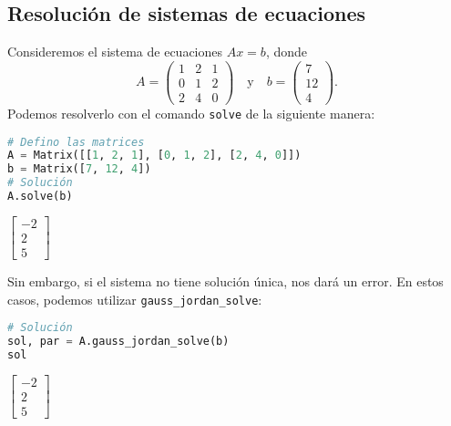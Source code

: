 \documentclass[a4,11pt]{aleph-notas}
\begin{document}
\subsection{Resolución de sistemas de ecuaciones}

Consideremos el sistema de ecuaciones \(Ax=b\), donde 
\[
    A = \begin{pmatrix}1 & 2 & 1\\0 & 1 & 2\\2 & 4 & 0\end{pmatrix}
    \quad\text{y}\quad
    b=\begin{pmatrix}7\\12\\4\end{pmatrix}.
\]
Podemos resolverlo con el comando \texttt{solve} de la siguiente manera:
\begin{pycodigo}
    \begin{ipynbcodigo}\begin{lstlisting}[language=Python]
# Defino las matrices
A = Matrix([[1, 2, 1], [0, 1, 2], [2, 4, 0]])
b = Matrix([7, 12, 4])
# Solución
A.solve(b)
    \end{lstlisting}\end{ipynbcodigo}
    \begin{ipynbsalida}[2mm]
$\displaystyle \left[\begin{matrix}-2\\2\\5\end{matrix}\right]$
    \end{ipynbsalida}
\end{pycodigo}

Sin embargo, si el sistema no tiene solución única, nos dará un error. En estos casos, podemos utilizar \texttt{gauss\_jordan\_solve}:

\begin{pycodigo}
    \begin{ipynbcodigo}\begin{lstlisting}[language=Python]
# Solución
sol, par = A.gauss_jordan_solve(b)
sol
    \end{lstlisting}\end{ipynbcodigo}
    \begin{ipynbsalida}[2mm]
$\displaystyle \left[\begin{matrix}-2\\2\\5\end{matrix}\right]$
    \end{ipynbsalida}
\end{pycodigo}
\end{document}
